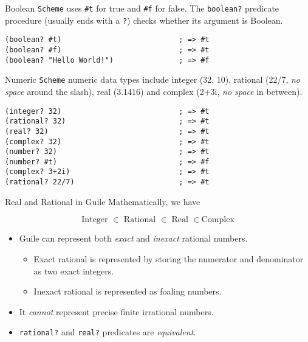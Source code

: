 \documentclass[presentation]{beamer}
\begin{document}
\begin{frame}[fragile,label={sec:orgheadline11}]{Boolean}
 \texttt{Scheme} uses \texttt{\#t} for true and \texttt{\#f} for false.  The \texttt{boolean?}
predicate procedure (usually ends with a \texttt{?}) checks whether its
argument is Boolean.

\begin{verbatim}
(boolean? #t)                           ; => #t
(boolean? #f)                           ; => #t
(boolean? "Hello World!")               ; => #f
\end{verbatim}
\end{frame}

\begin{frame}[fragile,label={sec:orgheadline12}]{Numeric}
 \texttt{Scheme} numeric data types include integer (32, 10), rational
(22/7, \emph{no space} around the slash), real (3.1416) and complex
(2+3i, \emph{no space} in between).

\begin{verbatim}
(integer? 32)                           ; => #t
(rational? 32)                          ; => #t
(real? 32)                              ; => #t
(complex? 32)                           ; => #t
(number? 32)                            ; => #t
(number? #t)                            ; => #f
(complex? 3+2i)                         ; => #t
(rational? 22/7)                        ; => #t
\end{verbatim}
\end{frame}

\begin{frame}[fragile,label={sec:orgheadline13}]{Real and Rational in Guile}
 Mathematically, we have

\[\text{Integer }\in\text{ Rational }\in\text{ Real }\in\text{
   Complex}
   \]

\begin{itemize}
\item Guile can represent both \emph{exact} and \emph{inexact} rational numbers.
\begin{itemize}
\item Exact rational is represented by storing the numerator and
denominator as two exact integers.
\item Inexact rational is represented as foaling numbers.
\end{itemize}
\item It \emph{cannot} represent precise finite irrational numbers.
\item \texttt{rational?} and \texttt{real?} predicates are \emph{equivalent}.
\end{itemize}
\end{frame}
\end{document}
